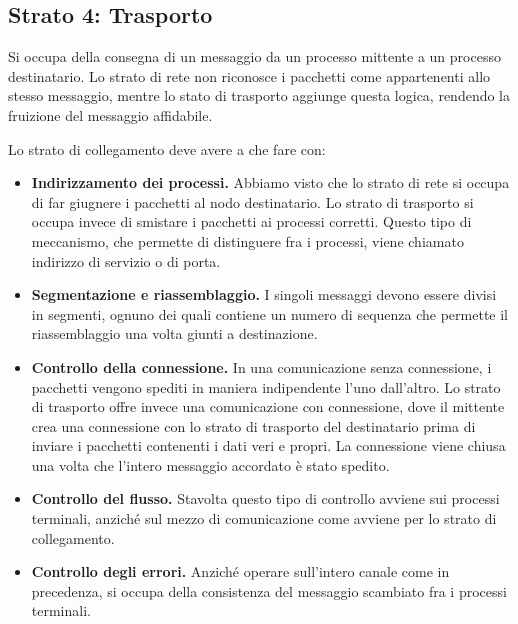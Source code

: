     \subsection{Strato 4: Trasporto}
        Si occupa della consegna di un messaggio da un processo mittente a un processo destinatario. Lo strato di rete non riconosce i pacchetti come appartenenti allo stesso messaggio, mentre lo stato di trasporto aggiunge questa logica, rendendo la fruizione del messaggio affidabile.
        
        Lo strato di collegamento deve avere a che fare con:
        \begin{itemize}
            \item \textbf{Indirizzamento dei processi.} Abbiamo visto che lo strato di rete si occupa di far giugnere i pacchetti al nodo destinatario. Lo strato di trasporto si occupa invece di smistare i pacchetti ai processi corretti. Questo tipo di meccanismo, che permette di distinguere fra i processi, viene chiamato indirizzo di servizio o di porta.
            
            \item \textbf{Segmentazione e riassemblaggio.} I singoli messaggi devono essere divisi in segmenti, ognuno dei quali contiene un numero di sequenza che permette il riassemblaggio una volta giunti a destinazione.
            
            \item \textbf{Controllo della connessione.} In una comunicazione senza connessione, i pacchetti vengono spediti in maniera indipendente l'uno dall'altro. Lo strato di trasporto offre invece una comunicazione con connessione, dove il mittente crea una connessione con lo strato di trasporto del destinatario prima di inviare i pacchetti contenenti i dati veri e propri. La connessione viene chiusa una volta che l'intero messaggio accordato è stato spedito.
            
            \item \textbf{Controllo del flusso.} Stavolta questo tipo di controllo avviene sui processi terminali, anziché sul mezzo di comunicazione come avviene per lo strato di collegamento.
            
            \item \textbf{Controllo degli errori.} Anziché operare sull'intero canale come in precedenza, si occupa della consistenza del messaggio scambiato fra i processi terminali.
        \end{itemize}
        
